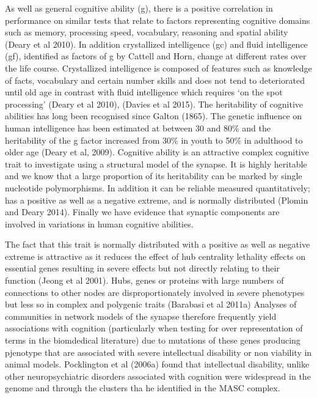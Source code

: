 As well as general cognitive ability (g), there is a positive correlation in performance on similar tests that relate to factors representing cognitive domains such as memory, processing speed, vocabulary, reasoning and spatial ability \cite{deary2010cognitive}(Deary et al 2010). In addition crystallized intelligence (gc) and fluid intelligence (gf), identified as factors of g by Cattell and Horn, change at different rates over the life course. Crystallized intelligence is composed of features such as knowledge of facts, vocabulary and certain number skills and does not tend to deteriorated until old age in contrast with fluid intelligence which requires ‘on the spot processing’ \cite{deary2010cognitive}(Deary et al 2010),\cite{davies2015genetic} (Davies et al 2015).
The heritability of cognitive abilities has long been recognised since Galton (1865). The genetic influence on human intelligence has been estimated at between 30 and 80\% and the heritability of the g factor increased from 30\% in youth to 50\% in adulthood to older age \cite{deary2009genetic}(Deary et al, 2009). 
Cognitive ability is an attractive complex cognitive trait to investigate using a structural model of the synapse. It is highly heritable and we know that a large proportion of its heritability can be marked by single nucleotide polymorphisms. In addition it can be reliable measured quantitatively; has a positive as well as a negative extreme, and is normally distributed \cite{plomin2015genetics}(Plomin and Deary 2014). Finally we have evidence that synaptic components are involved in variations in human cognitive abilities. 

The fact that this trait is normally distributed with a positive as well as negative extreme is attractive as it reduces the effect of hub centrality lethality effects on essential genes resulting in severe effects but not directly relating to their function \cite{jeong2001lethality}(Jeong et al 2001). Hubs, genes or proteins with large numbers of connections to other nodes are disproportionately involved in severe phenotypes but less so in complex and polygenic traits \cite{bayes2011characterization}(Barabasi et al 2011a) Analyses of communities in network models of the synapse therefore frequently yield associations with cognition (particularly when testing for over representation of terms in the biomdedical literature) due to mutations of these genes producing pjenotype that are associated with severe intellectual disability or non viability in animal models. Pocklington et al \cite{pocklington2006proteomes} (2006a) found that intellectual disability, unlike other neuropsychiatric disorders associated with cognition were widespread in the genome and through the clusters tha he identified in the MASC complex.

